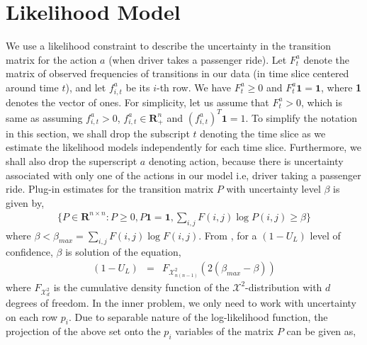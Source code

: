 \section{Likelihood Model} \label{section:likelihood}
We use a likelihood constraint to describe the uncertainty in the transition matrix for the action $a$ (when driver takes a passenger ride). Let $F^{a}_t$ denote the matrix of observed frequencies of transitions in our data (in time slice centered around time $t$), and let $f^{a}_{i,t}$ be its $i$-th row. We have $F^{a}_t \geq 0$ and $F^{a}_t\textbf{1} = \textbf{1}$, where \textbf{1} denotes the vector of ones. For simplicity, let us assume that $F^{a}_t > 0$, which is same as assuming $f^{a}_{i,t} > 0$, $f^{a}_{i,t} \in \textbf{R}^n_+$ and $(f^{a}_{i,t})^T\textbf{1} = 1$. To simplify the notation in this section, we shall drop the subscript $t$ denoting the time slice as we estimate the likelihood models independently for each time slice. Furthermore, we shall also drop the superscript $a$ denoting action, because there is uncertainty associated with only one of the actions in our model i.e, driver taking a passenger ride. Plug-in estimates for the transition matrix $P$ with uncertainty level $\beta$ is given by,
\begin{eqnarray*}
\bigg\{P \in \textbf{R}^{n \times n}: P \geq 0, P\textbf{1} = \textbf{1}, \sum_{i,j}F(i,j)\log P(i,j) \geq \beta \bigg\}
\end{eqnarray*}
where $\beta < \beta_{max} = \sum_{i,j}F(i,j)\log F(i,j)$. From \cite{lehmann2006testing}, for a $(1-U_L)$ level of confidence, $\beta$ is solution of the equation,
\begin{eqnarray*}
(1 - U_L) &=& F_{\mathcal{X}^{2}_{n(n-1)}}(2(\beta_{max} - \beta))
\end{eqnarray*}
where $F_{\mathcal{X}^{2}_{d}}$ is the cumulative density function of the $\mathcal{X}^2$-distribution with $d$ degrees of freedom. In the inner problem, we only need to work with uncertainty on each row $p_{i}$. Due to separable nature of the log-likelihood function, the projection of the above set onto the $p_{i}$ variables of the matrix $P$ can be given as,

